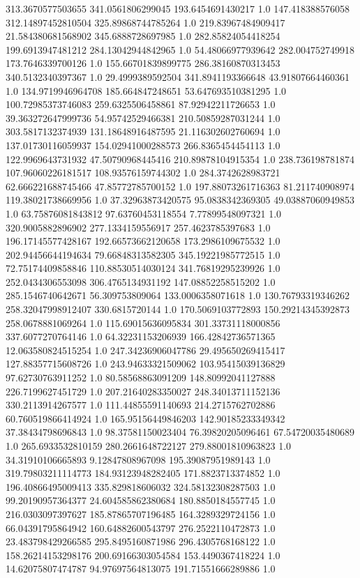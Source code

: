 313.3670577503655	341.0561806299045	193.6454691430217	1.0
147.418388576058	312.14897452810504	325.89868744785264	1.0
219.83967484909417	21.584380681568902	345.6888728697985	1.0
282.85824054418254	199.6913947481212	284.13042944842965	1.0
54.48066977939642	282.004752749918	173.7646339700126	1.0
155.66701839899775	286.38160870313453	340.5132340397367	1.0
29.4999389592504	341.8941193366648	43.91807664460361	1.0
134.9719946964708	185.664847248651	53.647693510381295	1.0
100.72985373746083	259.6325506458861	87.92942211726653	1.0
39.363272647999736	54.95742529466381	210.50859287031244	1.0
303.5817132374939	131.18648916487595	21.116302602760694	1.0
137.01730116059937	154.02941000288573	266.8365454454113	1.0
122.9969643731932	47.50790968445416	210.89878104915354	1.0
238.736198781874	107.96060226181517	108.93576159744302	1.0
284.3742628983721	62.666221688745466	47.85772785700152	1.0
197.88073261716363	81.211740908974	119.38021738669956	1.0
37.32963873420575	95.0838342369305	49.03887060949853	1.0
63.75876081843812	97.63760453118554	7.77899548097321	1.0
320.9005882896902	277.1334159556917	257.4623785397683	1.0
196.17145577428167	192.66573662120658	173.2986109675532	1.0
202.94456644194634	79.66848313582305	345.19221985772515	1.0
72.75174409858846	110.88530514030124	341.76819295239926	1.0
252.0434306553098	306.4765134931192	147.08852258515202	1.0
285.1546740642671	56.309753809064	133.0006358071618	1.0
130.76793319346262	258.32047998912407	330.6815720144	1.0
170.5069103772893	150.29214345392873	258.0678881069264	1.0
115.69015636095834	301.33731118000856	337.6077270764146	1.0
64.32231153206939	166.42842736571365	12.063580824515254	1.0
247.34236906047786	29.495650269415417	127.88357715608726	1.0
243.94633321509062	103.95415039136829	97.62730763911252	1.0
80.58568863091209	148.80992041127888	226.7199627451729	1.0
207.21640283350027	248.34013711152136	330.2113914267577	1.0
111.44855591140693	214.2715762702886	60.760519866414924	1.0
165.95156449846203	142.90185233349342	37.38434798696843	1.0
98.37581150023404	76.39820205096461	67.54720035480689	1.0
265.6933532810159	280.2661648722127	279.88001810963823	1.0
34.31910106665893	9.12847808967098	195.39087951989143	1.0
319.79803211114773	184.93123948282405	171.8823713374852	1.0
196.40866495009413	335.829818606032	324.58132308287503	1.0
99.20190957364377	24.604585862380684	180.8850184557745	1.0
216.0303097397627	185.87865707196485	164.3289329724156	1.0
66.04391795864942	160.64882600543797	276.2522110472873	1.0
23.483798429266585	295.8495160871986	296.4305768168122	1.0
158.26214153298176	200.69166303054584	153.4490367418224	1.0
14.62075807474787	94.97697564813075	191.71551666289886	1.0
